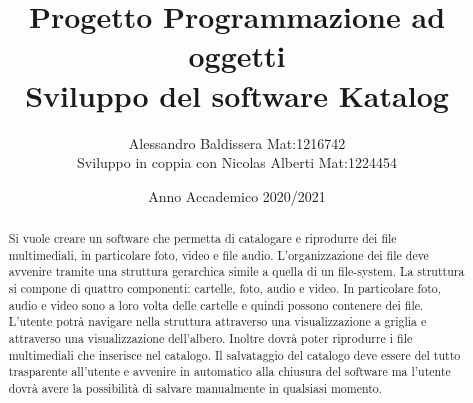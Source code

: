 \documentclass[11pt, letterpaper]{article}
\title{\textbf{Progetto Programmazione ad oggetti \\ Sviluppo del software Katalog}}
\author{Alessandro Baldissera Mat:1216742 \\ Sviluppo in coppia con Nicolas Alberti Mat:1224454}
\date{Anno Accademico 2020/2021}
\begin{document}
\maketitle

\begin{abstract}
    Si vuole creare un software che permetta di catalogare e riprodurre
    dei file multimediali, in particolare foto, video e file audio.
    L'organizzazione dei file deve avvenire tramite una struttura gerarchica 
    simile a quella di un file-system.
    La struttura si compone di quattro componenti: cartelle, foto, audio e video.
    In particolare foto, audio e video sono a loro volta delle cartelle e 
    quindi possono contenere dei file.
    L'utente potrà navigare nella struttura attraverso una visualizzazione a griglia
    e attraverso una visualizzazione dell'albero. Inoltre dovrà poter riprodurre
    i file multimediali che inserisce nel catalogo. Il salvataggio del catalogo
    deve essere del tutto trasparente all'utente e avvenire in automatico alla
    chiusura del software ma l'utente dovrà avere la possibilità di salvare manualmente
    in qualsiasi momento.
\end{abstract}

\tableofcontents{}
\newpage
















\end{document}
